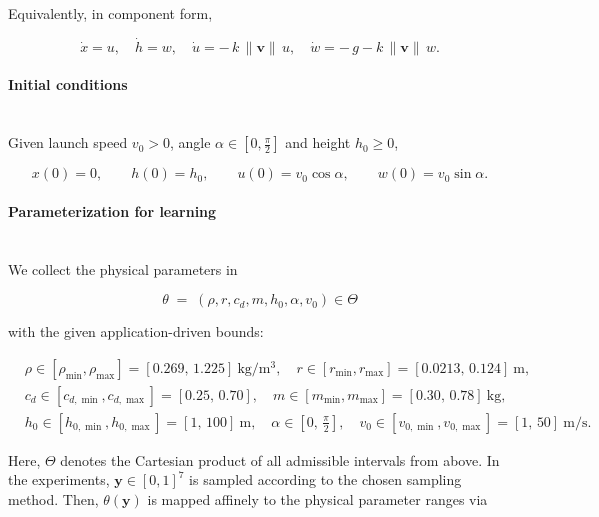 Equivalently, in component form,

\begin{equation}
\label{eq:proj_ode_components}
\dot x = u,\quad
\dot h = w,\quad
\dot u = -\,k\,\|\mathbf{v}\|\,u,\quad
\dot w = -\,g - k\,\|\mathbf{v}\|\,w.
\end{equation}

\paragraph{Initial conditions} \ \\
Given launch speed $v_0>0$, angle $\alpha\in[0,\frac{\pi}{2}]$ and height
$h_0\ge 0$,

\begin{equation}
\label{eq:proj_ic}
x(0)=0,\qquad h(0)=h_0,\qquad
u(0)=v_0\cos\alpha,\qquad w(0)=v_0\sin\alpha.
\end{equation}

\paragraph{Parameterization for learning} \ \\
We collect the physical parameters in

\begin{equation*}
    \theta \;=\; (\rho, r, c_d, m, h_0, \alpha, v_0) \in \Theta
\end{equation*}

with the given application-driven bounds:

\begin{equation*}
\begin{aligned}
&\rho\in[\rho_{\min},\rho_{\max}] = [0.269,\,1.225]~\mathrm{kg/m^3},\quad
r\in[r_{\min},r_{\max}] = [0.0213,\,0.124]~\mathrm{m},\\
&c_d\in[c_{d,\min},c_{d,\max}] = [0.25,\,0.70],\quad
m\in[m_{\min},m_{\max}] = [0.30,\,0.78]~\mathrm{kg},\\
&h_0\in[h_{0,\min},h_{0,\max}] = [1,\,100]~\mathrm{m},\quad
\alpha\in[0,\,\frac{\pi}{2}],\quad
v_0\in[v_{0,\min},v_{0,\max}] = [1,\,50]~\mathrm{m/s}.
\end{aligned}
\end{equation*}

Here, $\Theta$ denotes the Cartesian product of all admissible intervals from
above. In the experiments, $\mathbf{y}\in[0,1]^7$ is sampled according to the
chosen sampling method. Then, $\theta(\mathbf y)$ is mapped affinely to the
physical parameter ranges via

